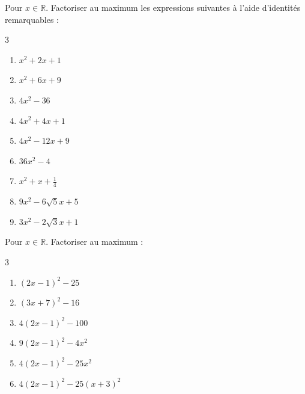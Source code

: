 \documentclass[main.tex]{subfiles}
\begin{document}
\begin{exercise}\label{chap02:exo:factoriser:identite:niveau1} Pour $x\in\mathbb{R}$. Factoriser au maximum les expressions suivantes à l'aide d'identités remarquables :
	\begin{multicols}{3}
		\begin{enumerate}[label={$\Alph*(x)=$},left= 0pt]
			\item $x^2 + 2x + 1$ 
			\item $x^2 + 6x + 9$
			\item $4x^2-36$
			\item $4x^2 + 4x + 1$ 
			\item $4x^2 - 12x + 9$
			\item $36x^2-4$ 
			\item $x^2 + x + \tfrac{1}{4}$  
			\item $9x^2-6\sqrt{5}x + 5$  
			\item $3x^2-2\sqrt{3}x + 1$  
		\end{enumerate}
	\end{multicols}
\end{exercise}
\begin{exercise}\label{chap02:exo:factoriser:identite:niveau2}  Pour $x\in\mathbb{R}$. Factoriser au maximum  :
	\begin{multicols}{3}
		\begin{enumerate}[label={$\Alph*(x)=$},left= 0pt]
			\item $(2x-1)^2-25$
			\item $(3x+7)^2-16$
			\item $4(2x-1)^2-100$  
			\item $9(2x-1)^2-4x^2$
			\item $4(2x-1)^2-25x^2$  
			\item $4(2x-1)^2-25(x+3)^2$  
		\end{enumerate}
	\end{multicols}
\end{exercise}
\end{document}
